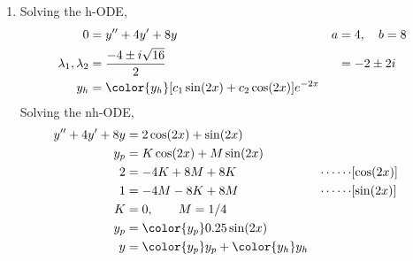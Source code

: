 \begin{enumerate}
    \item Solving the h-ODE,
          \begin{align}
              0                        & = y'' + 4y' + 8y               &
              a                        & = 4, \quad b = 8                 \\
              \lambda_{1}, \lambda_{2} & = \frac{-4 \pm i\sqrt{16}}{2}  &
                                       & = -2 \pm 2i                      \\
              y_{h}                    & = \color{y_h} [c_{1}\sin(2x) +
                  c_{2}\cos(2x)]e^{-2x}
          \end{align}
          Solving the nh-ODE,
          \begin{align}
              y'' + 4y' + 8y & = 2\cos(2x) + \sin(2x)                        \\
              y_{p}          & = K \cos(2x) + M \sin(2x)                     \\
              2              & = -4K + 8M + 8K                             &
              \cdots\cdots   & [\cos(2x)]                                    \\
              1              & = -4M - 8K + 8M                             &
              \cdots\cdots   & [\sin(2x)]                                    \\
              K              & = 0, \qquad M = 1/4                           \\
              y_{p}          & = \color{y_p} 0.25 \sin(2x)                   \\
              y              & = {\color{y_p} y_{p}} + {\color{y_h} y_{h}}
          \end{align}


\end{enumerate}
